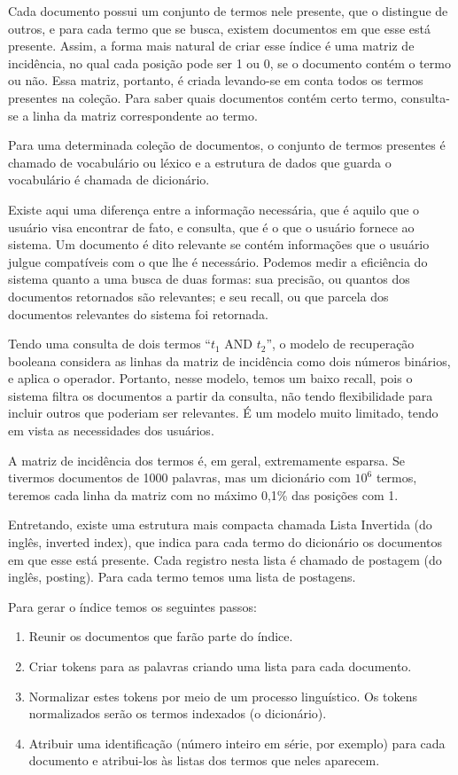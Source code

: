 Cada documento possui um conjunto de termos nele presente, que o distingue de outros, e para cada termo que se busca, existem documentos em que esse está presente. Assim, a forma mais natural de criar esse índice é uma matriz de incidência, no qual cada posição pode ser 1 ou 0, se o documento contém o termo ou não. Essa matriz, portanto, é criada levando-se em conta todos os termos presentes na coleção. Para saber quais documentos contém certo termo, consulta-se a linha da matriz correspondente ao termo.

Para uma determinada coleção de documentos, o conjunto de termos presentes é chamado de vocabulário ou léxico e a estrutura de dados que guarda o vocabulário é chamada de dicionário.

Existe aqui uma diferença entre a informação necessária, que é aquilo que o usuário visa encontrar de fato, e consulta, que é o que o usuário fornece ao sistema. Um documento é dito relevante se contém informações que o usuário julgue compatíveis com o que lhe é necessário. Podemos medir a eficiência do sistema quanto a uma busca de duas formas: sua precisão, ou quantos dos documentos retornados são relevantes; e seu recall, ou que parcela dos documentos relevantes do sistema foi retornada.

Tendo uma consulta de dois termos “$t_{1}$ AND $t_{2}$”, o modelo de recuperação booleana considera as linhas da matriz de incidência como dois números binários, e aplica o operador. Portanto, nesse modelo, temos um baixo recall, pois o sistema filtra os documentos a partir da consulta, não tendo flexibilidade para incluir outros que poderiam ser relevantes. É um modelo muito limitado, tendo em vista as necessidades dos usuários.

A matriz de incidência dos termos é, em geral, extremamente esparsa. Se tivermos documentos de 1000 palavras, mas um dicionário com $10^{6}$ termos, teremos cada linha da matriz com no máximo 0,1\% das posições com 1. 

Entretando, existe uma estrutura mais compacta chamada Lista Invertida (do inglês, inverted index), que indica para cada termo do dicionário os documentos em que esse está presente. Cada registro nesta lista é chamado de postagem (do inglês, posting). Para cada termo temos uma lista de postagens. 

Para gerar o índice temos os seguintes passos:
\begin{enumerate}
\item Reunir os documentos que farão parte do índice.
\item Criar tokens para as palavras criando uma lista para cada documento.
\item Normalizar estes tokens por meio de um processo linguístico. Os tokens normalizados serão os termos indexados (o dicionário).
\item Atribuir uma identificação (número inteiro em série, por exemplo) para cada documento e atribui-los às listas dos termos que neles aparecem.
\end{enumerate}

